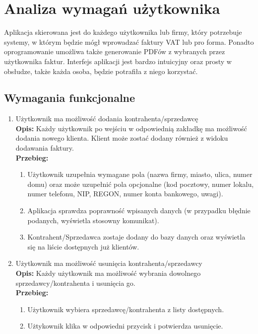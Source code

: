 \chapter{Analiza wymagań użytkownika}

Aplikacja skierowana jest do każdego użytkownika lub firmy, który potrzebuje systemy, w którym będzie mógł wprowadzać faktury VAT lub pro forma. Ponadto oprogramowanie umożliwa także generowanie PDFów z wybranych przez użytkownika faktur. Interfejs aplikacji jest bardzo intuicyjny oraz prosty w obsłudze, także każda osoba, będzie potrafiła z niego korzystać.

\section{Wymagania funkcjonalne}
\begin{enumerate}
    \item Użytkownik ma możliwość dodania kontrahenta/sprzedawcę \\
    \textbf{Opis: } Każdy użytkownik po wejściu w odpowiednią zakładkę ma możliwość dodania nowego klienta. Klient może zostać dodany również z widoku dodawania faktury.\\
    \textbf{Przebieg: }
    \begin{enumerate}
        \item Użytkownik uzupełnia wymagane pola (nazwa firmy, miasto, ulica, numer domu) oraz może uzupełnić pola opcjonalne (kod pocztowy, numer lokalu, numer telefonu, NIP, REGON, numer konta bankowego, uwagi).
        \item Aplikacja sprawdza poprawność wpisanych danych (w przypadku błędnie podanych, wyświetla stosowny komunikat).
        \item Kontrahent/Sprzedawca zostaje dodany do bazy danych oraz wyświetla się na liście dostępnych już klientów.\\
    \end{enumerate}
    
    \item Użytkownik ma możliwość usunięcia kontrahenta/sprzedawcy\\
    \textbf{Opis: } Każdy użytkownik ma możliwość wybrania dowolnego sprzedawcy/kontrahenta i usunięcia go.\\
    \textbf{Przebieg: } 
    \begin{enumerate}
        \item Użytkownik wybiera sprzedawcę/kontrahenta z listy dostępnych.
        \item Użtykownik klika w odpowiedni przycisk i potwierdza usunięcie.\\
    \end{enumerate}
    

\end{enumerate}
